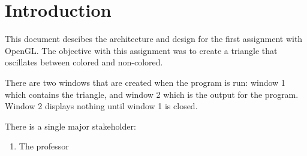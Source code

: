 \section{Introduction}
\label{section:intro}

This document descibes the architecture and design for the first assignment with OpenGL.
The objective with this assignment was to create a triangle that oscillates between colored and non-colored.

There are two windows that are created when the program is run:
window 1 which contains the triangle, and window 2 which is the output for the program.
Window 2 displays nothing until window 1 is closed.

\vspace{0.1cm}

There is a single major stakeholder:
\begin{enumerate}
    \item The professor
\end{enumerate}
